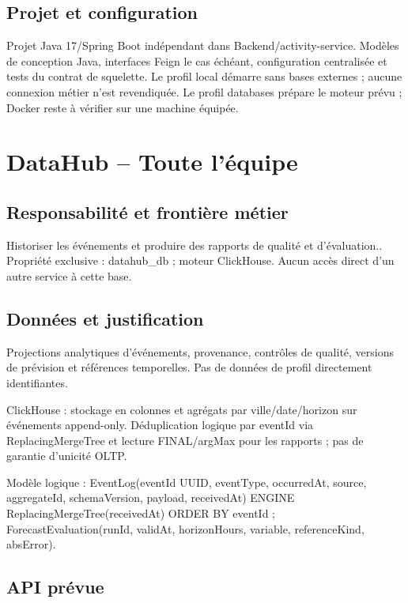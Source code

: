 \documentclass[10pt,a4paper]{article}
\begin{document}
\subsection*{Projet et configuration}

Projet Java 17/Spring Boot indépendant dans Backend/activity-service. Modèles de conception Java, interfaces Feign le cas échéant, configuration centralisée et tests du contrat de squelette. Le profil local démarre sans bases externes ; aucune connexion métier n'est revendiquée. Le profil databases prépare le moteur prévu ; Docker reste à vérifier sur une machine équipée.\par
\clearpage
\section*{DataHub  --  Toute l'équipe}

\subsection*{Responsabilité et frontière métier}

Historiser les événements et produire des rapports de qualité et d'évaluation.. Propriété exclusive : datahub\_db ; moteur ClickHouse. Aucun accès direct d'un autre service à cette base.\par

\subsection*{Données et justification}

Projections analytiques d'événements, provenance, contrôles de qualité, versions de prévision et références temporelles. Pas de données de profil directement identifiantes.\par

ClickHouse : stockage en colonnes et agrégats par ville/date/horizon sur événements append-only. Déduplication logique par eventId via ReplacingMergeTree et lecture FINAL/argMax pour les rapports ; pas de garantie d'unicité OLTP.\par

Modèle logique : EventLog(eventId UUID, eventType, occurredAt, source, aggregateId, schemaVersion, payload, receivedAt) ENGINE ReplacingMergeTree(receivedAt) ORDER BY eventId ; ForecastEvaluation(runId, validAt, horizonHours, variable, referenceKind, absError).\par

\subsection*{API prévue}
\end{document}
